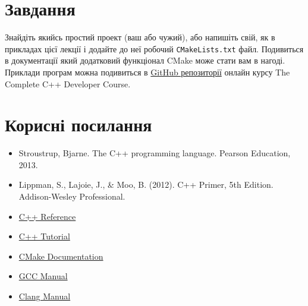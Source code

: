 \documentclass[12pt]{article}
\begin{document}
	\section*{Завдання}
	Знайдіть якийсь простий проект (ваш або чужий), або напишіть свій, як в прикладах цієї лекції і додайте до неї робочий \texttt{CMakeLists.txt} файл. Подивиться в документації який додатковий функціонал CMake може стати вам в нагоді. Приклади програм можна подивиться в \href{https://github.com/profjpbaugh/complete-cpp-developer-course}{GitHub репозиторії} онлайн курсу The Complete C++ Developer Course.
	
	\section*{Корисні посилання}
	
	\begin{itemize}
		\item Stroustrup, Bjarne. The C++ programming language. Pearson Education, 2013.
		\item Lippman, S., Lajoie, J., \& Moo, B. (2012). C++ Primer, 5th Edition. Addison-Wesley Professional.
		\item \href{https://en.cppreference.com/w/cpp}{C++ Reference}
		\item \href{http://www.cplusplus.com/doc/tutorial/}{C++ Tutorial}
		\item \href{https://cmake.org/cmake/help/latest/}{CMake Documentation}
		\item \href{https://gcc.gnu.org/onlinedocs/gcc-12.2.0/gcc/}{GCC Manual}
		\item \href{https://releases.llvm.org/10.0.0/tools/clang/docs/index.html}{Clang Manual}
	\end{itemize}
	
	
\end{document}
